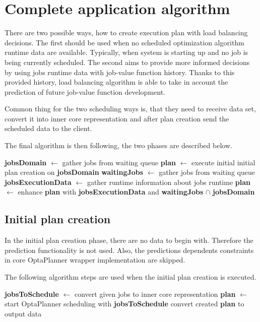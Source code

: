 \section{Complete application algorithm}\label{sec:olb-algorithm}

There are two possible ways, 
how to create execution plan with load balancing decisions.
The first should be used when no scheduled optimization algorithm runtime data are available.
Typically, when system is starting up
and no job is being currently scheduled.
The second aims to provide more informed decisions by using jobs runtime data with job-value function history.
Thanks to this provided history,
load balancing algorithm is able to take in account the prediction of future job-value function development.

Common thing for the two scheduling ways is,
that they need to receive data set, 
convert it into inner core representation
and after plan creation send the scheduled data to the client.

The final algorithm is then following, 
the two phases are described below.
\begin{algorithm}[H]
    \SetAlgoLined
    \textbf{jobsDomain} $\leftarrow$ gather jobs from waiting queue\;
    \textbf{plan} $\leftarrow$ execute initial initial plan creation on \textbf{jobsDomain}\;
	 {
        \textbf{waitingJobs} $\leftarrow$ gather jobs from waiting queue\;
        \textbf{jobsExecutionData} $\leftarrow$ gather runtime information about jobs runtime\;
        \textbf{plan} $\leftarrow$ enhance \textbf{plan} with \textbf{jobsExecutionData} 
        and \textbf{waitingJobs} $\cap$ \textbf{jobsDomain}\;
	}
\end{algorithm} 

\subsection{Initial plan creation}\label{subsec:initial-plan-creation}

In the initial plan creation phase, 
there are no data to begin with.
Therefore the prediction functionality is not used.
Also, 
the predictions dependents constraints in core OptaPlanner wrapper implementation are skipped. 

The following algorithm steps are used when the initial plan creation is executed. 

\begin{algorithm}[H]
	\SetAlgoLined
	\textbf{jobsToSchedule} $\leftarrow$ convert given jobs to inner core representation\;
	\textbf{plan} $\leftarrow$ start OptaPlanner scheduling with \textbf{jobsToSchedule}\;
	convert created \textbf{plan} to output data\;
\end{algorithm} 

